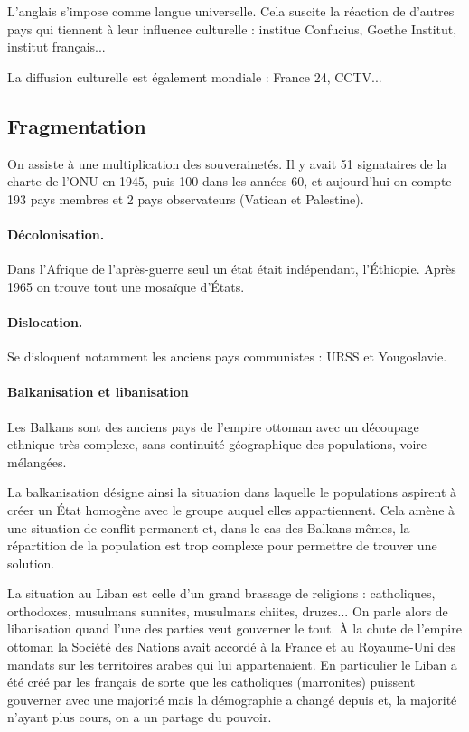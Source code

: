\documentclass[a4paper,10pt]{article}
\begin{document}
			L'anglais s'impose comme langue universelle.
			Cela suscite la réaction de d'autres pays qui tiennent à leur influence culturelle : institue Confucius, Goethe Institut, institut français...

			La diffusion culturelle est également mondiale : France 24, CCTV...

	\subsection{Fragmentation}

		On assiste à une multiplication des souverainetés.
		Il y avait 51 signataires de la charte de l'ONU en 1945, puis 100 dans les années 60, et aujourd'hui on compte 193 pays membres et 2 pays observateurs (Vatican et Palestine).

		\paragraph{Décolonisation.}

		Dans l'Afrique de l'après-guerre seul un état était indépendant, l'Éthiopie.
		Après 1965 on trouve tout une mosaïque d'États.

		\paragraph{Dislocation.}

		Se disloquent notamment les anciens pays communistes : URSS et Yougoslavie.

		\paragraph{Balkanisation et libanisation}

		Les Balkans sont des anciens pays de l'empire ottoman avec un découpage ethnique très complexe, sans continuité géographique des populations, voire mélangées.

		La balkanisation désigne ainsi la situation dans laquelle le populations aspirent à créer un État homogène avec le groupe auquel elles appartiennent.
		Cela amène à une situation de conflit permanent et, dans le cas des Balkans mêmes, la répartition de la population est trop complexe pour permettre de trouver une solution.

		La situation au Liban est celle d'un grand brassage de religions : catholiques, orthodoxes, musulmans sunnites, musulmans chiites, druzes...
		On parle alors de libanisation quand l'une des parties veut gouverner le tout.
		À la chute de l'empire ottoman la Société des Nations avait accordé à la France et au Royaume-Uni des mandats sur les territoires arabes qui lui appartenaient.
		En particulier le Liban a été créé par les français de sorte que les catholiques (marronites) puissent gouverner avec une majorité mais la démographie a changé depuis et, la majorité n'ayant plus cours, on a un partage du pouvoir.
\end{document}

